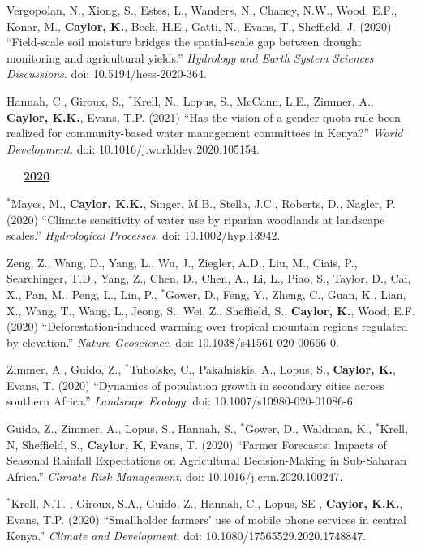 \documentclass[10pt]{report}
\begin{document}
\begin{etaremune}
\item Vergopolan, N., Xiong, S., Estes, L., Wanders, N., Chaney, N.W., Wood, E.F., Konar, M., \textbf{Caylor, K.}, Beck, H.E., Gatti, N., Evans, T.,  Sheffield, J. (2020) ``Field-scale soil moisture bridges the spatial-scale gap between drought monitoring and agricultural yields.'' {\em Hydrology and Earth System Sciences Discussions}. doi: 10.5194/hess-2020-364.

\item Hannah, C., Giroux, S., $^{*}$Krell, N., Lopus, S., McCann, L.E., Zimmer, A., \textbf{Caylor, K.K.}, Evans, T.P. (2021) ``Has the vision of a gender quota rule been realized for community-based water management committees in Kenya?'' {\em World Development}. doi: 10.1016/j.worlddev.2020.105154.

\mbox{\ \ \ \underline{\textbf{2020}}}

\item $^{*}$Mayes, M., \textbf{Caylor, K.K.}, Singer, M.B., Stella, J.C., Roberts, D., Nagler, P. (2020) ``Climate sensitivity of water use by riparian woodlands at landscape scales.'' {\em Hydrological Processes}. doi: 10.1002/hyp.13942.

\item Zeng, Z., Wang, D., Yang, L.,  Wu, J.,  Ziegler, A.D., Liu, M., Ciais, P., Searchinger, T.D., Yang, Z., Chen, D., Chen, A., Li, L., Piao, S., Taylor, D., Cai, X., Pan, M., Peng, L., Lin, P., $^{*}$Gower, D., Feng, Y.,  Zheng, C., Guan, K., Lian, X., Wang, T., Wang, L., Jeong, S., Wei, Z., Sheffield, S., \textbf{Caylor, K.}, Wood, E.F. (2020) ``Deforestation-induced warming over tropical mountain regions regulated by elevation.'' {\em Nature Geoscience}. doi: 10.1038/s41561-020-00666-0.
 
\item Zimmer, A., Guido, Z., $^{*}$Tuholske, C., Pakalniskis, A., Lopus, S., \textbf{Caylor, K.}, Evans, T. (2020) ``Dynamics of population growth in secondary cities across southern Africa.'' {\em Landscape Ecology}. doi: 10.1007/s10980-020-01086-6.

\item Guido, Z., Zimmer, A., Lopus, S., Hannah, S., $^{*}$Gower, D.,  Waldman, K., $^{*}$Krell, N, Sheffield, S., \textbf{Caylor, K},  Evans, T. (2020) ``Farmer Forecasts: Impacts of Seasonal Rainfall Expectations on Agricultural Decision-Making in Sub-Saharan Africa.'' {\em Climate Risk Management}. doi: 10.1016/j.crm.2020.100247.

\item  $^{*}$Krell, N.T. , Giroux, S.A., Guido, Z., Hannah, C., Lopus, SE , \textbf{Caylor, K.K.}, Evans, T.P. (2020) ``Smallholder farmers' use of mobile phone services in central Kenya.'' {\em Climate and Development}. doi: 10.1080/17565529.2020.1748847.


\end{etaremune}
\end{document}
